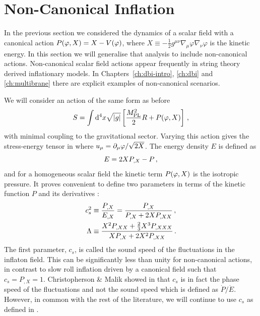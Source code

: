 \section{Non-Canonical Inflation} 
\label{sec:noncanoninfl}

In the previous section we considered the dynamics of a scalar field with a
canonical action $P(\varphi, X) = X - V(\varphi)$, where $X \equiv -\frac{1}{2}g^{\mu
\nu}\nabla_\mu \varphi \nabla_\nu \varphi$ is the kinetic energy. 
In this
section we will generalise
that analysis to include non-canonical actions. Non-canonical scalar
field actions appear frequently in string theory derived inflationary models.
In Chapters~\ref{ch:dbi-intro}, \ref{ch:dbi} and \ref{ch:multibrane}
there are explicit examples of non-canonical scenarios.

We will consider an action of the same form as before
% 
\begin{equation}
\label{eq:DBIaction-dbiintro2}
S=\int  \mathrm{d}^4x \sqrt{|g|} \left[ \frac{M_{\mathrm{PL}}^2}{2} R 
+ P (\varphi , X) \right] \,,
\end{equation}
% 
with minimal coupling to the gravitational sector. Varying this action gives the
stress-energy tensor in
 where $u_\mu = \partial_\mu\varphi/\sqrt{2X}$. 
The energy density $E$ is defined as
\begin{equation}
 E = 2XP_{,X} - P\,,
\end{equation}
% 
and for a homogeneous scalar field the kinetic term $P(\varphi, X)$ is the
isotropic pressure. 
It proves convenient to define two parameters in terms of the 
kinetic function $P$ and its derivatives \cite{lidser1,lidser3}: 
% 
\begin{align}
\label{eq:defcs-dbiintro}
 c_s^2 &\equiv \frac{P_{,X}}{E_{,X}} =  \frac{P_{,X}}{P_{,X} + 2X P_{,XX}} \,,
\\
\label{eq:deflambda-dbiintro}
\Lambda &\equiv  \frac{X^2 P_{,XX} +
\frac{2}{3}X^3 P_{,XXX}}{X P_{,X} +
2X^2 P_{,XX}}\,.
\end{align}
% 
The first parameter, $c_s$, is called the sound speed of the fluctuations
in the inflaton field. This can be significantly less than unity for non-canonical
actions, 
in contrast to slow roll inflation driven by a canonical 
field such that $c_s = P_{,X} =1$.
% 
Christopherson \& Malik showed in  that $c_s$
is in fact the phase speed of the fluctuations and not the sound speed
which is defined as $\dot{P}/\dot{E}$. However, in common with the rest of the
literature, we will continue to use $c_s$ as defined in . 

